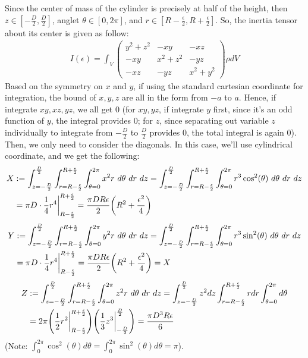 \documentclass{article}
\DeclarePairedDelimiter{\paran}{(}{)}%
\begin{document}
Since the center of mass of the cylinder is precisely at half of the height, then $z\in [-\frac{D}{2},\frac{D}{2}]$, anglet $\theta\in [0,2\pi]$, and $r\in [R-\frac{\epsilon}{2},R+\frac{\epsilon}{2}]$. So, the inertia tensor about its center is given as follow:
\begin{align}
    I(\epsilon) = \int_V \begin{pmatrix}
        y^2+z^2 & -xy & -xz\\
        -xy & x^2+z^2 & -yz\\
        -xz & -yz & x^2+y^2
    \end{pmatrix}\rho dV
\end{align}
Based on the symmetry on $x$ and $y$, if using the standard cartesian coordinate for integration, the bound of $x,y,z$ are all in the form from $-a$ to $a$. Hence, if integrate $xy,xz,yz$, we all get $0$ (for $xy,yz$, if integrate $y$ first, since it's an odd function of $y$, the integral provides $0$; for $z$, since separating out variable $z$ individually to integrate from $-\frac{D}{2}$ to $\frac{D}{2}$ provides $0$, the total integral is again $0$). Then, we only need to consider the diagonals. In this case, we'll use cylindrical coordinate, and we get the following:
\begin{align}
    X &:= \int_{z=-\frac{D}{2}}^{\frac{D}{2}}\int_{r=R-\frac{\epsilon}{2}}^{R+\frac{\epsilon}{2}}\int_{\theta =0}^{2\pi}x^2 r\ d\theta\ dr\ dz = \int_{z=-\frac{D}{2}}^{\frac{D}{2}}\int_{r=R-\frac{\epsilon}{2}}^{R+\frac{\epsilon}{2}}\int_{\theta =0}^{2\pi}r^3\cos^2(\theta)\ d\theta\ dr\ dz\\
    &= \pi D\cdot\frac{1}{4}r^4\bigg|_{R-\frac{\epsilon}{2}}^{R+\frac{\epsilon}{2}} = \frac{\pi DR\epsilon}{2}\paran*{R^2+\frac{\epsilon^2}{4}}
\end{align}
\begin{align}
    Y &:=\int_{z=-\frac{D}{2}}^{\frac{D}{2}}\int_{r=R-\frac{\epsilon}{2}}^{R+\frac{\epsilon}{2}}\int_{\theta =0}^{2\pi}y^2 r\ d\theta\ dr\ dz = \int_{z=-\frac{D}{2}}^{\frac{D}{2}}\int_{r=R-\frac{\epsilon}{2}}^{R+\frac{\epsilon}{2}}\int_{\theta =0}^{2\pi}r^3\sin^2(\theta)\ d\theta\ dr\ dz\\
    &= \pi D\cdot\frac{1}{4}r^4\bigg|_{R-\frac{\epsilon}{2}}^{R+\frac{\epsilon}{2}} = \frac{\pi DR\epsilon}{2}\paran*{R^2+\frac{\epsilon^2}{4}} = X
\end{align}
\begin{align}
    Z &:=\int_{z=-\frac{D}{2}}^{\frac{D}{2}}\int_{r=R-\frac{\epsilon}{2}}^{R+\frac{\epsilon}{2}}\int_{\theta =0}^{2\pi}z^2 r\ d\theta\ dr\ dz = \int_{z=-\frac{D}{2}}^{\frac{D}{2}}z^2dz\int_{r=R-\frac{\epsilon}{2}}^{R+\frac{\epsilon}{2}}rdr\int_{\theta=0}^{2\pi}d\theta\\
    &= 2\pi\paran*{\frac{1}{2}r^2\bigg|_{R-\frac{\epsilon}{2}}^{R+\frac{\epsilon}{2}}}\paran*{\frac{1}{3}z^3\bigg|_{-\frac{D}{2}}^{\frac{D}{2}}} = \frac{\pi D^3R\epsilon}{6}
\end{align}
(Note: $\int_{0}^{2\pi}\cos^2(\theta)d\theta=\int_{0}^{2\pi}\sin^2(\theta)d\theta=\pi$).
\end{document}
